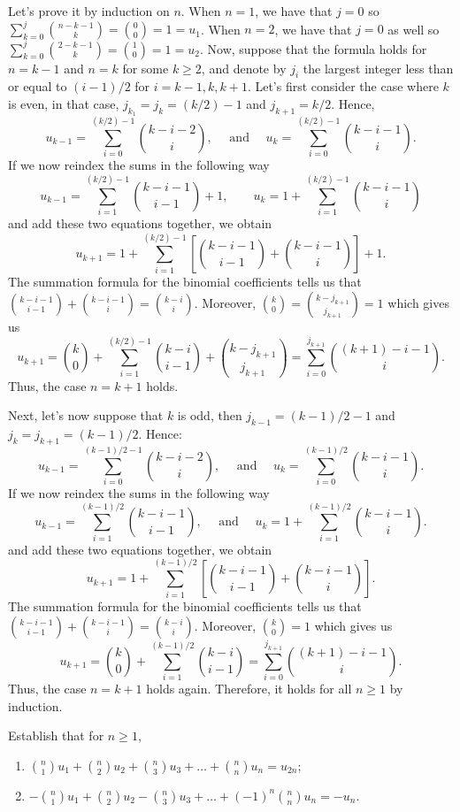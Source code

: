 \begin{solution}
    Let's prove it by induction on $n$. When $n = 1$, we have that $j = 0$ so $\sum_{k=0}^{j}\binom{n-k-1}{k} = \binom{0}{0} = 1 = u_1$. When $n = 2$, we have that $j = 0$ as well so $\sum_{k=0}^{j}\binom{2-k-1}{k} = \binom{1}{0} = 1 = u_2$. Now, suppose that the formula holds for $n = k-1$ and $n = k$ for some $k \geq 2$, and denote by $j_i$ the largest integer less than or equal to $(i-1)/2$ for $i = k-1, k, k+1$. Let's first consider the case where $k$ is even, in that case, $j_{k_1} = j_k = (k/2) - 1$ and $j_{k+1} = k/2$. Hence, 
    $$u_{k-1} = \sum_{i=0}^{(k/2) - 1}\binom{k-i-2}{i},\quad \text{ and } \quad u_k = \sum_{i=0}^{(k/2) - 1}\binom{k-i-1}{i}.$$
    If we now reindex the sums in the following way
    $$u_{k-1} = \sum_{i=1}^{(k/2) - 1}\binom{k-i-1}{i-1} + 1,\qquad u_k = 1 + \sum_{i=1}^{(k/2) - 1}\binom{k-i-1}{i}$$
    and add these two equations together, we obtain 
    $$u_{k+1} = 1 + \sum_{i=1}^{(k/2) - 1}\left[\binom{k-i-1}{i-1} + \binom{k-i-1}{i}\right] + 1.$$
    The summation formula for the binomial coefficients tells us that $\binom{k-i-1}{i-1} + \binom{k-i-1}{i} = \binom{k-i}{i}$. Moreover, $\binom{k}{0} = \binom{k - j_{k+1}}{j_{k+1}} = 1$ which gives us
    $$u_{k+1} = \binom{k}{0} + \sum_{i=1}^{(k/2) - 1}\binom{k-i}{i-1} + \binom{k-j_{k+1}}{j_{k+1}} = \sum_{i=0}^{j_{k+1}}\binom{(k+1) - i - 1}{i}.$$
    Thus, the case $n = k+1$ holds. 
    
    Next, let's now suppose that $k$ is odd, then $j_{k-1} = (k-1)/2 - 1$ and $j_k = j_{k+1} = (k-1)/2$. Hence:
    $$u_{k-1} = \sum_{i=0}^{(k-1)/2 - 1}\binom{k-i-2}{i}, \quad \text{ and } \quad u_k = \sum_{i=0}^{(k-1)/2}\binom{k-i-1}{i}.$$
    If we now reindex the sums in the following way
    $$u_{k-1} = \sum_{i=1}^{(k-1)/2}\binom{k-i-1}{i-1}, \quad \text{ and } \quad u_k = 1 + \sum_{i=1}^{(k-1)/2}\binom{k-i-1}{i}.$$
    and add these two equations together, we obtain 
    $$u_{k+1} = 1 + \sum_{i=1}^{(k-1)/2}\left[\binom{k-i-1}{i-1} + \binom{k-i-1}{i}\right].$$
    The summation formula for the binomial coefficients tells us that $\binom{k-i-1}{i-1} + \binom{k-i-1}{i} = \binom{k-i}{i}$. Moreover, $\binom{k}{0} = 1$ which gives us
    $$u_{k+1} = \binom{k}{0} + \sum_{i=1}^{(k-1)/2}\binom{k-i}{i-1} = \sum_{i=0}^{j_{k+1}}\binom{(k+1) - i - 1}{i}.$$
    Thus, the case $n = k+1$ holds again. Therefore, it holds for all $n \geq 1$ by induction. \\
\end{solution}

\begin{exercise}
    Establish that for $n \geq 1$,
    \begin{enumerate}
        \item $\binom{n}{1}u_1 + \binom{n}{2}u_2 + \binom{n}{3}u_3 + \dots + \binom{n}{n}u_n = u_{2n}$;
        \item $-\binom{n}{1}u_1 + \binom{n}{2}u_2 - \binom{n}{3}u_3 + \dots + (-1)^n\binom{n}{n}u_n = -u_n$.\\
    \end{enumerate}
\end{exercise}

